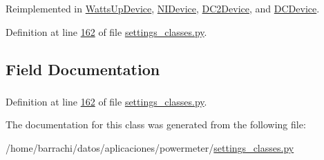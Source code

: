 \-Reimplemented in \hyperlink{classsettings__classes_1_1_watts_up_device_ac775ee34451fdfa742b318538164070e}{\-Watts\-Up\-Device}, \hyperlink{classsettings__classes_1_1_n_i_device_ac775ee34451fdfa742b318538164070e}{\-N\-I\-Device}, \hyperlink{classsettings__classes_1_1_d_c2_device_ac775ee34451fdfa742b318538164070e}{\-D\-C2\-Device}, and \hyperlink{classsettings__classes_1_1_d_c_device_ac775ee34451fdfa742b318538164070e}{\-D\-C\-Device}.



\-Definition at line \hyperlink{settings__classes_8py_source_l00162}{162} of file \hyperlink{settings__classes_8py_source}{settings\-\_\-classes.\-py}.



\subsection{\-Field \-Documentation}
\hypertarget{classsettings__classes_1_1_attached_device_a98f8cb986fbbcd435b452dc91dc6e8c1}{
\subsubsection[{computer}]{}}\label{classsettings__classes_1_1_attached_device_a98f8cb986fbbcd435b452dc91dc6e8c1}


\-Definition at line \hyperlink{settings__classes_8py_source_l00162}{162} of file \hyperlink{settings__classes_8py_source}{settings\-\_\-classes.\-py}.



\-The documentation for this class was generated from the following file\-:\begin{DoxyCompactItemize}
\item 
/home/barrachi/datos/aplicaciones/powermeter/\hyperlink{settings__classes_8py}{settings\-\_\-classes.\-py}\end{DoxyCompactItemize}
